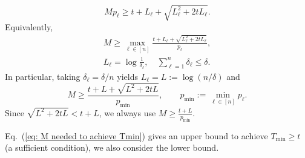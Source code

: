 \documentclass[aps,prx,reprint,superscriptaddress,amsmath,amssymb,longbibliography,floatfix]{revtex4-2}
\theoremstyle{plain}
\theoremstyle{definition}
\theoremstyle{remark}
\begin{document}
\begin{equation*}
    Mp_\ell \ge t+L_\ell+\sqrt{L_\ell^2+2tL_\ell}.
\end{equation*}
Equivalently,
\begin{equation}
\begin{gathered}
M \ge \max_{\ell\in[n]}\frac{t+L_\ell+\sqrt{L_\ell^2+2tL_\ell}}{p_\ell},
    \\ L_\ell=\log\frac{1}{\delta_\ell},\quad \sum_{\ell=1}^n \delta_\ell\le \delta.
    \label{eq:nonunif_Tmin_M_bound}
\end{gathered}
\end{equation}
In particular, taking $\delta_\ell=\delta/n$ yields $L_\ell=L:=\log(n/\delta)$ and
\begin{equation}
    M \ge \frac{t+L+\sqrt{L^2+2tL}}{p_{\min}},\qquad p_{\min}:=\min_{\ell\in[n]}p_\ell. \label{eq: M needed to achieve Tmin}
\end{equation}
Since $\sqrt{L^2+2tL} <t+L$, we always use $M\ge \frac{t+L}{p_{\min}}$.

Eq.~(\ref{eq: M needed to achieve Tmin}) gives an upper bound to achieve $T_{\min} \ge t$ (a sufficient condition), we also consider the lower bound.
\end{document}
